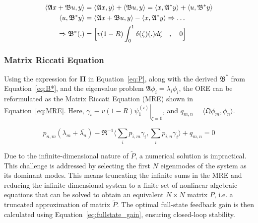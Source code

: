 \begin{equation} \label{eq:B*}
    \begin{aligned}
        \langle \mathfrak{A} x + \mathfrak{B} u, y \rangle
        &= \langle \mathfrak{A} x, y \rangle
        + \langle \mathfrak{B} u, y \rangle
        = \langle x, \mathfrak{A}^* y\rangle
        + \langle u, \mathfrak{B}^* y \rangle \\
        \langle u, \mathfrak{B}^* y \rangle
        &= \langle \mathfrak{A} x + \mathfrak{B} u, y \rangle
        - \langle x, \mathfrak{A}^* y\rangle
        \Rightarrow \hdots \\ \Rightarrow \mathfrak{B}^* (.) &= \Bigl[ v(1-R) \int_0^1 \delta(\zeta) (.) d\zeta \quad , \quad 0 \Bigr]
    \end{aligned}
\end{equation}

\subsubsection{Matrix Riccati Equation}

Using the expression for $\mathbf{\Pi}$ in Equation~\ref{eq:P}, along with the derived $\mathfrak{B}^*$ from Equation~\ref{eq:B*}, and the eigenvalue problem $\mathfrak{A}\phi_i = \lambda_i \phi_i$, the ORE can be reformulated as the Matrix Riccati Equation (MRE) shown in Equation~\ref{eq:MRE}. Here, $\gamma_i \equiv v(1-R) \left. \psi_{1}^{(i)} \right|_{\zeta = 0}$, and $q_{m,n} = \langle \mathfrak{Q} \phi_m, \phi_n \rangle$.

\begin{equation}\label{eq:MRE}
    p_{n,m} (\lambda_m + \overline{\lambda_n})
    - \mathfrak{R}^{-1} \langle \sum_i p_{i,m} \gamma_i, \sum_i p_{i,n} \gamma_i \rangle
    + q_{m,n} = 0
\end{equation}

Due to the infinite-dimensional nature of $\tilde{P}$, a numerical solution is impractical. This challenge is addressed by selecting the first $N$ eigenmodes of the system as its dominant modes. This means truncating the infinite sums in the MRE and reducing the infinite-dimensional system to a finite set of nonlinear algebraic equations that can be solved to obtain an equivalent $N \times N$ matrix $P$, i.e. a truncated approximation of matrix $\tilde{P}$. The optimal full-state feedback gain is then calculated using Equation~\ref{eq:fullstate_gain}, ensuring closed-loop stability.

